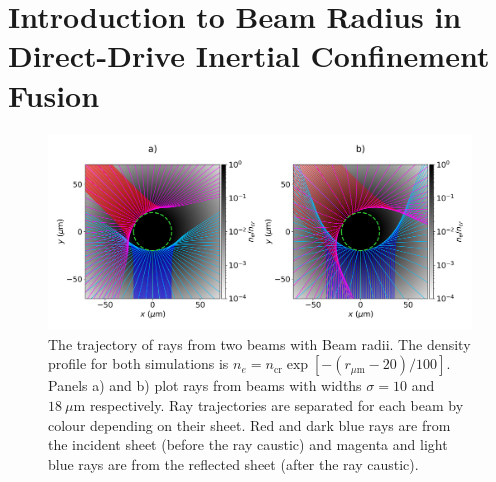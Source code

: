 \newpage

\section{Introduction to Beam Radius in Direct-Drive Inertial Confinement Fusion}%
\label{sec:Res1_Beamrad_intro}

\begin{figure}[t!]
    \includegraphics[width=\linewidth]{Results1/Images/RbRt_beam_overlap_alt.png}
    \centering
    \caption{The trajectory of rays from two beams with Beam radii.
    The density profile for both simulations is $n_e=n_{\text{cr}}\exp{[ -(r_{\mu\text{m}}-20)/100 ]}$.
    Panels a) and b) plot rays from beams with widths $\sigma=10$ and $18\ \mu\text{m}$ respectively.
    Ray trajectories are separated for each beam by colour depending on their sheet.
    Red and dark blue rays are from the incident sheet (before the ray caustic) and magenta and light blue rays are from the reflected sheet (after the ray caustic).}%
    \label{fig:Res1_RbRt_beam_overlap}
\end{figure}

